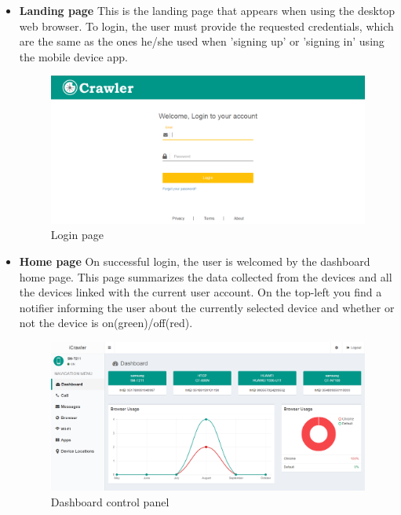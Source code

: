 \documentclass[hidelinks, 12pt, oneside]{article}
\begin{document}
	\begin{itemize}
	 	\item \textbf{Landing page}\newline
	 	This is the landing page that appears when using the desktop web browser. To login, the user must provide the requested credentials, which are the same as the ones he/she used when 'signing up' or 'signing in' using the mobile device app.
	 	 
	 	 \begin{figure}[h!]
	 	 	\caption{Login page}
	 	 	\centering 																																		\includegraphics[width=1 \textwidth]{img/dashboard/loginPage.png}
	 	 \end{figure}\newpage
	 	 
		\item \textbf{Home page}\newline
	 	On successful login, the user is welcomed by the dashboard home page.\newline
	 	This page summarizes the data collected from the devices and all the devices linked with the current user account. On the top-left you find a notifier informing the user about the currently selected device and whether or not the device is on(green)/off(red).
	 	 
	 	 \begin{figure}[h!]
	 	 	\caption{Dashboard control panel}
	 	 	\centering 																																		\includegraphics[width=1 \textwidth]{img/dashboard/dashboardLandingPage.png}
	 	 \end{figure}\newpage	
	 	 

\end{itemize}
\end{document}
